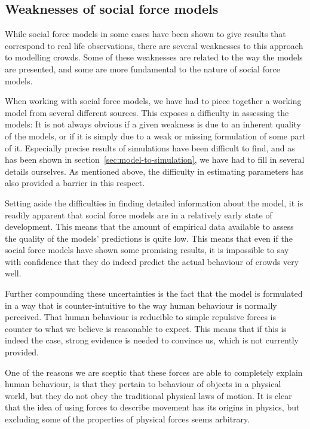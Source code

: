 \subsection{Weaknesses of social force models}
While social force models in some cases have been shown to give results that 
correspond to real life observations, there are several weaknesses to this 
approach to modelling crowds. Some of these weaknesses are related to the way 
the models are presented, and some are more fundamental to the nature of 
social force models.

When working with social force models, we have had to piece together a working 
model from several different sources. This exposes a difficulty in assessing 
the models: It is not always obvious if a given weakness is due to an inherent 
quality of the models, or if it is simply due to a weak or missing formulation 
of some part of it. Especially precise results of simulations have been 
difficult to find, and as has been shown in 
section~\ref{sec:model-to-simulation}, we have had to fill in several details 
ourselves. As mentioned above, the difficulty in estimating parameters has 
also provided a barrier in this respect.

Setting aside the difficulties in finding detailed information about the 
model, it is readily apparent that social force models are in a relatively 
early state of development. This means that the amount of empirical data 
available to assess the quality of the models' predictions is quite low. This 
means that even if the social force models have shown some promising results, 
it is impossible to say with confidence that they do indeed predict the actual 
behaviour of crowds very well.

Further compounding these uncertainties is the fact that the model is 
formulated in a way that is counter-intuitive to the way human behaviour is 
normally perceived. That human behaviour is reducible to simple repulsive 
forces is counter to what we believe is reasonable to expect. This means that 
if this is indeed the case, strong evidence is needed to convince us, which is 
not currently provided.

One of the reasons we are sceptic that these forces are able to completely 
explain human behaviour, is that they pertain to behaviour of objects in a 
physical world, but they do not obey the traditional physical laws of motion.  
It is clear that the idea of using forces to describe movement has its origins 
in physics, but excluding some of the properties of physical forces seems 
arbitrary.

